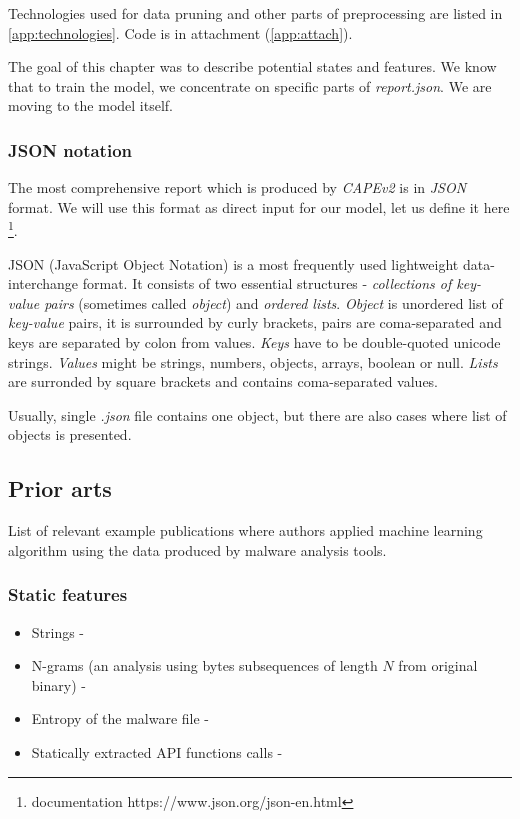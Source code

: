 Technologies used for data pruning and other parts of preprocessing are listed in \ref{app:technologies}. Code is in attachment (\ref{app:attach}).

The goal of this chapter was to describe potential states and features. We know that to train the model, we concentrate on specific parts of \emph{report.json}. We are moving to the model itself.







\subsubsection{JSON notation} \label{sec:json_notation}
The most comprehensive report which is produced by \emph{CAPEv2} is in \emph{JSON} format. We will use this format as direct input for our model, let us define it here \footnote{documentation https://www.json.org/json-en.html}.

JSON (JavaScript Object Notation) is a most frequently used lightweight data-interchange format. It consists of two essential structures - \emph{collections of key-value pairs} (sometimes called \emph{object}) and \emph{ordered lists}. 
\emph{Object} is unordered list of \emph{key-value} pairs, it is surrounded by curly brackets, pairs are coma-separated and keys are separated by colon from values. \emph{Keys} have to be double-quoted unicode strings. \emph{Values} might be strings, numbers, objects, arrays, boolean or null. \emph{Lists} are surronded by square brackets and contains coma-separated values.

Usually, single \emph{.json} file contains one object, but there are also cases where list of objects is presented.

\subsection{Prior arts}
List of relevant example publications where authors applied machine learning algorithm using the data produced by malware analysis tools.
\subsubsection{Static features}
\begin{itemize}
  \item Strings - \cite{Lee2011}
  \item N-grams (an analysis using bytes subsequences of length $N$ from original binary) - \cite{Fuyong2017}
  \item Entropy of the malware file - \cite{Wojnowicz2018}
  \item Statically extracted API functions calls - \cite{Ahmadi2016}
\end{itemize}

